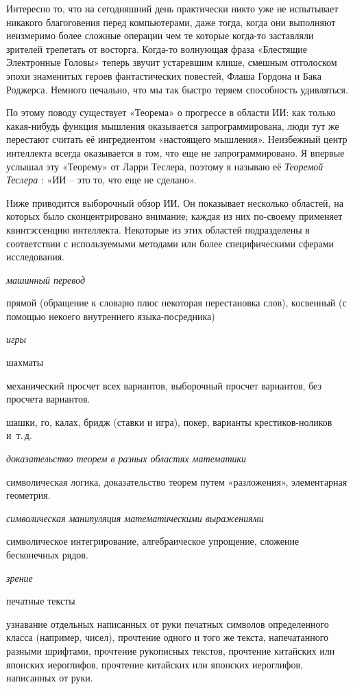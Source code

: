 \documentclass[../main.tex]{subfiles}
\begin{document}
Интересно то, что на сегодняшний день практически никто уже не испытывает никакого благоговения перед компьютерами, даже тогда, когда они выполняют неизмеримо более сложные операции чем те которые когда-то заставляли зрителей трепетать от восторга. Когда-то волнующая фраза «Блестящие Электронные Головы» теперь звучит устаревшим клише, смешным отголоском эпохи знаменитых героев фантастических повестей, Флаша Гордона и Бака Роджерса. Немного печально, что мы так быстро теряем способность удивляться.

По этому поводу существует «Теорема» о прогрессе в области ИИ: как только какая-нибудь функция мышления оказывается запрограммирована, люди тут же перестают считать её ингредиентом «настоящего мышления». Неизбежный центр интеллекта всегда оказывается в том, что еще не запрограммировано. Я впервые услышал эту «Теорему» от Ларри Теслера, поэтому я называю её \emph{Теоремой Теслера} : «ИИ \--- это то, что еще не сделано».

Ниже приводится выборочный обзор ИИ\@. Он показывает несколько областей, на которых было сконцентрировано внимание; каждая из них по-своему применяет квинтэссенцию интеллекта. Некоторые из этих областей подразделены в соответствии с используемыми методами или более специфическими сферами исследования.

\emph{машинный перевод}

прямой (обращение к словарю плюс некоторая перестановка слов), косвенный (с помощью некоего внутреннего языка-посредника)

\emph{игры}

шахматы

механический просчет всех вариантов, выборочный просчет вариантов, без просчета вариантов.

шашки, го, калах, бридж (ставки и игра), покер, варианты крестиков-ноликов и~т.\,д.

\emph{доказательство теорем в разных областях математики}

символическая логика, доказательство теорем путем «разложения», элементарная геометрия.

\emph{символическая манипуляция математическими выражениями}

символическое интегрирование, алгебраическое упрощение, сложение бесконечных рядов.

\emph{зрение}

печатные тексты

узнавание отдельных написанных от руки печатных символов определенного класса (например, чисел), прочтение одного и того же текста, напечатанного разными шрифтами, прочтение рукописных текстов, прочтение китайских или японских иероглифов, прочтение китайских или японских иероглифов, написанных от руки.
\end{document}
